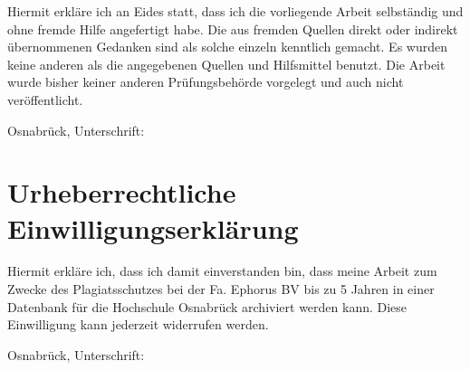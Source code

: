 \documentclass[a4paper,12pt,bibliography=totoc]{scrreprt}
\begin{document}
\newpage
{}
\label{erklaerung}

Hiermit erkläre ich an Eides statt, dass ich die vorliegende Arbeit selbständig und ohne fremde Hilfe angefertigt habe. Die aus fremden Quellen direkt oder indirekt übernommenen Gedanken sind als solche einzeln kenntlich gemacht. Es wurden keine anderen als die angegebenen Quellen und Hilfsmittel benutzt. Die Arbeit wurde bisher keiner anderen Prüfungsbehörde vorgelegt und auch nicht veröffentlicht.
\vspace*{2em}

Osnabrück, \hrulefill\qquad Unterschrift: \hrulefill
\vspace*{3em}


\section*{Urheberrechtliche Einwilligungserklärung}

Hiermit erkläre ich, dass ich damit einverstanden bin, dass meine Arbeit zum Zwecke des Plagiatsschutzes bei der Fa. Ephorus BV bis zu 5 Jahren in einer Datenbank für die Hochschule Osnabrück archiviert werden kann. Diese Einwilligung kann jederzeit widerrufen werden.
\vspace*{2em}

Osnabrück, \hrulefill\qquad Unterschrift: \hrulefill
\end{document}
